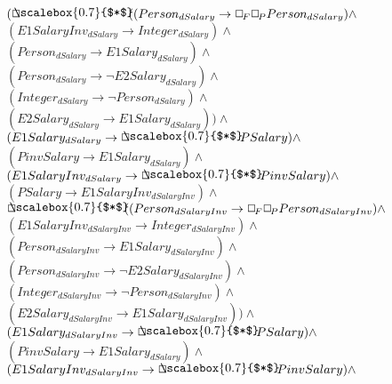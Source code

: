 \documentclass[a4paper,10pt]{article}
\begin{document}
 \newcommand{\nxt}{{\ensuremath\raisebox{0.25ex}{\text{\scriptsize$\bigcirc$}}}}
\newcommand{\Rdiamond}{\Diamond_{\!F}}
\newcommand{\Rbox}{\Box_{\!F}}
\newcommand{\Rnext}{\nxt_{\!F}}
\newcommand{\Ldiamond}{\Diamond_{\!P}}
\newcommand{\Lbox}{\Box_{\!P}}
\newcommand{\Lnext}{\nxt_{\!P}}
\newcommand{\SVdiamond}{\mathop{\ooalign{$\Diamond$ \cr \kern0.5ex
    \raisebox{0.35ex}{\scalebox{0.7}{$*$}}} \kern-0.9ex}}
\newcommand{\SVbox}{\mathop{\ooalign{$\Box$ \cr \kern0.42ex
    \raisebox{0.3ex}{\scalebox{0.7}{$*$}}} \kern-0.9ex}}


$( \SVbox ((Person_{dSalary} \rightarrow  \Rbox  \Lbox Person_{dSalary}) \land $ \\ 
 $ (E1SalaryInv_{dSalary} \rightarrow Integer_{dSalary}) \land $ \\ 
 $ (Person_{dSalary} \rightarrow E1Salary_{dSalary}) \land $ \\ 
 $ (Person_{dSalary} \rightarrow  \lnot E2Salary_{dSalary}) \land $ \\ 
 $ (Integer_{dSalary} \rightarrow  \lnot Person_{dSalary}) \land $ \\ 
 $ (E2Salary_{dSalary} \rightarrow E1Salary_{dSalary})) \land $ \\ 
 $ (E1Salary_{dSalary} \rightarrow  \SVbox PSalary) \land $ \\ 
 $ (PinvSalary \rightarrow E1Salary_{dSalary}) \land $ \\ 
 $ (E1SalaryInv_{dSalary} \rightarrow  \SVbox PinvSalary) \land $ \\ 
 $ (PSalary \rightarrow E1SalaryInv_{dSalaryInv}) \land $ \\ 
 $  \SVbox ((Person_{dSalaryInv} \rightarrow  \Rbox  \Lbox Person_{dSalaryInv}) \land $ \\ 
 $ (E1SalaryInv_{dSalaryInv} \rightarrow Integer_{dSalaryInv}) \land $ \\ 
 $ (Person_{dSalaryInv} \rightarrow E1Salary_{dSalaryInv}) \land $ \\ 
 $ (Person_{dSalaryInv} \rightarrow  \lnot E2Salary_{dSalaryInv}) \land $ \\ 
 $ (Integer_{dSalaryInv} \rightarrow  \lnot Person_{dSalaryInv}) \land $ \\ 
 $ (E2Salary_{dSalaryInv} \rightarrow E1Salary_{dSalaryInv})) \land $ \\ 
 $ (E1Salary_{dSalaryInv} \rightarrow  \SVbox PSalary) \land $ \\ 
 $ (PinvSalary \rightarrow E1Salary_{dSalary}) \land $ \\ 
 $ (E1SalaryInv_{dSalaryInv} \rightarrow  \SVbox PinvSalary) \land $ \\ 
\end{document}
